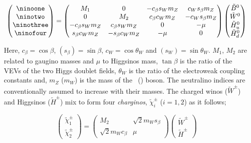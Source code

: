 				\begin{equation}
				\label{eq:neutralino_mixing}
					\begin{pmatrix}  \ninoone \\ \ninotwo \\ \ninothree \\ \ninofour \end{pmatrix}	
					= 
					\begin{pmatrix}
						M_1 & 0 & - c_\beta s_W m_Z &  c_W s_\beta m_Z  \\
						0 & M_2 & c_\beta c_W m_Z  &  - c_W s_\beta m_Z \\
						- c_\beta s_W m_Z  & c_\beta s_W m_Z  & 0 & - \mu \\ 
						s_\beta c_W m_Z  & - s_\beta c_W m_Z & - \mu & 0  
					\end{pmatrix}
					\begin{pmatrix}
						\tilde{B}^{0} \\
						\tilde{W}^{0} \\
						\tilde{H}^{0}_u \\
						\tilde{H}^{0}_d
					\end{pmatrix}
				\end{equation}

				\noindent Here, $c_{\beta} = \cos \beta$,  $(s_{\beta}) = \sin \beta$, $c_W = \cos \theta_W$ and $(s_W) = \sin \theta_W$. $M_1$, $M_2$ are related to gaugino masses and $\mu$ to Higgsinos mass, $\tan \beta$ is the ratio of the \ac{VEV}s of the two Higgs doublet fields, $\theta_W$ is the ratio of the electroweak coupling constants and, $m_Z$ ($m_W$) is the mass of the \Zboson\ (\Wboson) boson. The neutralino indices are conventionally assumed to increase with their masses. The charged winos ($\tilde{W}^{\pm}$) and Higgsinos ($\tilde{H}^{\pm}$) mix to form four \textit{charginos}, $\tilde{\chi}^{\pm}_i$ ($i=1,2$) as it follows;

				\begin{equation}
				\label{eq:chargino_mixing}
						\begin{pmatrix}  \tilde{\chi}^{\pm}_1 \\ \tilde{\chi}^{\pm}_2 \end{pmatrix}	
						= 
						\begin{pmatrix}
							M_2 & \sqrt{2} m_W s_\beta \\
							\sqrt{2} m_W c_\beta & \mu  
						\end{pmatrix}
						\begin{pmatrix}
							\tilde{W}^{\pm} \\
							\tilde{H}^{\pm}
						\end{pmatrix}
				\end{equation}

